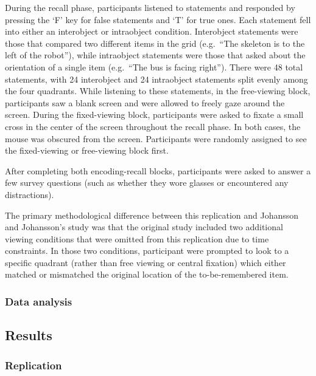 \documentclass[
  man,floatsintext]{apa6}
\begin{document}
During the recall phase, participants listened to statements and
responded by pressing the `F' key for false statements and `T' for true
ones. Each statement fell into either an interobject or intraobject
condition. Interobject statements were those that compared two different
items in the grid (e.g.~``The skeleton is to the left of the robot''),
while intraobject statements were those that asked about the orientation
of a single item (e.g.~``The bus is facing right''). There were 48 total
statements, with 24 interobject and 24 intraobject statements split
evenly among the four quadrants. While listening to these statements, in
the free-viewing block, participants saw a blank screen and were allowed
to freely gaze around the screen. During the fixed-viewing block,
participants were asked to fixate a small cross in the center of the
screen throughout the recall phase. In both cases, the mouse was
obscured from the screen. Participants were randomly assigned to see the
fixed-viewing or free-viewing block first.

After completing both encoding-recall blocks, participants were asked to
answer a few survey questions (such as whether they wore glasses or
encountered any distractions).

The primary methodological difference between this replication and
Johansson and Johansson's study was that the original study included two
additional viewing conditions that were omitted from this replication
due to time constraints. In those two conditions, participant were
prompted to look to a specific quadrant (rather than free viewing or
central fixation) which either matched or mismatched the original
location of the to-be-remembered item.

\hypertarget{data-analysis}{%
\subsubsection{Data analysis}\label{data-analysis}}

\hypertarget{results-1}{%
\subsection{Results}\label{results-1}}

\hypertarget{replication-1}{%
\subsubsection{Replication}\label{replication-1}}
\end{document}
